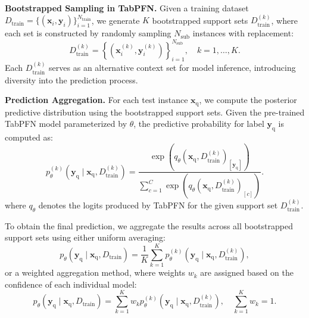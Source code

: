\textbf{Bootstrapped Sampling in TabPFN.} 
Given a training dataset \( D_{\text{train}} = \{ (\boldsymbol{x}_{i}, \boldsymbol{y}_{i}) \}_{i=1}^{N_{\text{train}}} \), we generate \( K \) bootstrapped support sets \( D_{\text{train}}^{(k)} \), where each set is constructed by randomly sampling \( N_{\text{sub}} \) instances with replacement:
\begin{equation}
D_{\text{train}}^{(k)} = \left\{ \left(\boldsymbol{x}_{i}^{(k)}, \boldsymbol{y}_{i}^{(k)}\right) \right\}_{i=1}^{N_{\text{sub}}}, \quad k = 1, \dots, K.
\end{equation}
Each \( D_{\text{train}}^{(k)} \) serves as an alternative context set for model inference, introducing diversity into the prediction process.

\textbf{Prediction Aggregation.} 
For each test instance \( \boldsymbol{x}_{\text{q}} \), we compute the posterior predictive distribution using the bootstrapped support sets. Given the pre-trained TabPFN model parameterized by \( \theta \), the predictive probability for label \( \boldsymbol{y}_{\text{q}} \) is computed as:
\begin{equation}
p_{\theta}^{(k)}(\boldsymbol{y}_{\text{q}} \mid \boldsymbol{x}_{\text{q}}, D_{\text{train}}^{(k)}) = 
\frac{\exp(q_{\theta}(\boldsymbol{x}_{\text{q}}, D_{\text{train}}^{(k)})_{[\boldsymbol{y}_{\text{q}}]})}
{\sum_{c=1}^{C} \exp(q_{\theta}(\boldsymbol{x}_{\text{q}}, D_{\text{train}}^{(k)})_{[c]})}.
\end{equation}
where \( q_{\theta} \) denotes the logits produced by TabPFN for the given support set \( D_{\text{train}}^{(k)} \).

To obtain the final prediction, we aggregate the results across all bootstrapped support sets using either uniform averaging:
\begin{equation}
p_{\theta}(\boldsymbol{y}_{\text{q}} \mid \boldsymbol{x}_{\text{q}}, D_{\text{train}}) = 
\frac{1}{K} \sum_{k=1}^{K} p_{\theta}^{(k)}(\boldsymbol{y}_{\text{q}} \mid \boldsymbol{x}_{\text{q}}, D_{\text{train}}^{(k)}),
\end{equation}
or a weighted aggregation method, where weights \( w_k \) are assigned based on the confidence of each individual model:
\begin{equation}
p_{\theta}(\boldsymbol{y}_{\text{q}} \mid \boldsymbol{x}_{\text{q}}, D_{\text{train}}) = 
\sum_{k=1}^{K} w_k p_{\theta}^{(k)}(\boldsymbol{y}_{\text{q}} \mid \boldsymbol{x}_{\text{q}}, D_{\text{train}}^{(k)}), \quad \sum_{k=1}^{K} w_k = 1.
\end{equation}

